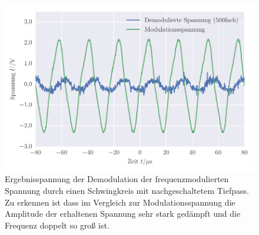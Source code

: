 
\FloatBarrier\begin{figure}[!h]
\centering
\includegraphics[scale=1]{../Grafiken/Frequenz_Moduliert_Demodulation.pdf}
\caption{Ergebnisspannung der Demodulation der frequenzmodulierten Spannung
	durch einen Schwingkreis mit nachgeschaltetem Tiefpass. Zu erkennen ist 
	dass im Vergleich zur Modulationsspannung die Amplitude der 
	erhaltenen Spannung sehr stark gedämpft und die Frequenz doppelt so groß ist. \label{fig:frequenz_moduliert_demodulation}}
\end{figure}
\FloatBarrier